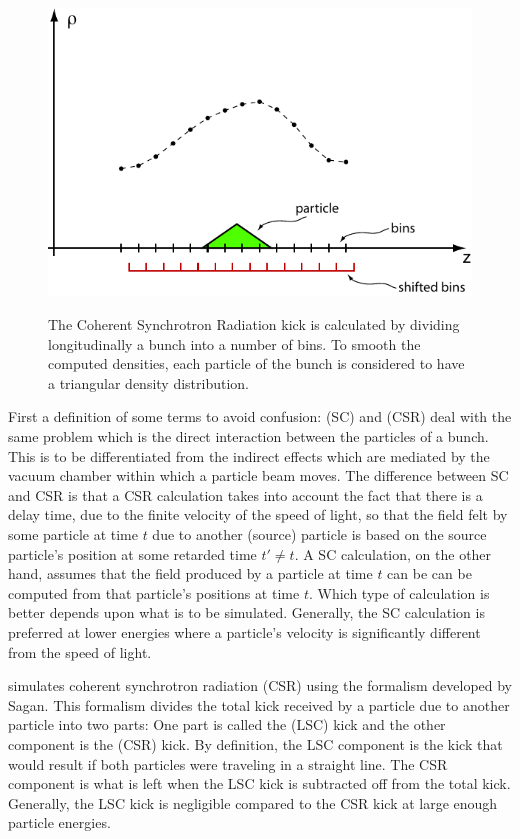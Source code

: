 \begin{figure}[!b]
\centering
\includegraphics[height=8.4cm]{csr-bin.pdf}
\caption[CSR Calculation]
{The Coherent Synchrotron Radiation kick is calculated by dividing
longitudinally a bunch into a number of bins. To smooth the computed
densities, each particle of the bunch is considered to have a
triangular density distribution.}
\label{f:csr.bin}
\end{figure}

First a definition of some terms to avoid confusion:  (SC)
and  (CSR) deal with the same problem
which is the direct interaction between the particles of a bunch. This is
to be differentiated from the indirect  effects which are
mediated by the vacuum chamber within which a particle beam moves. The
difference between SC and CSR is that a CSR calculation takes into account
the fact that there is a delay time, due to the finite velocity of the
speed of light, so that the field felt by some particle at time $t$ due to
another (source) particle is based on the source particle's position at
some retarded time $t' \ne t$. A SC calculation, on the other hand, assumes
that the field produced by a particle at time $t$ can be can be computed
from that particle's positions at time $t$. Which type of calculation is
better depends upon what is to be simulated. Generally, the SC calculation
is preferred at lower energies where a particle's velocity is significantly
different from the speed of light.

\bmad simulates coherent synchrotron radiation (CSR) using the
formalism developed by Sagan\cite{b:csr}.  This formalism divides the
total kick received by a particle due to another particle into two
parts: One part is called the  (LSC)
kick and the other component is the  (CSR) kick. By definition, the LSC component is the
kick that would result if both particles were traveling in a straight
line. The CSR component is what is left when the LSC kick is
subtracted off from the total kick. Generally, the LSC kick is
negligible compared to the CSR kick at large enough particle energies.

